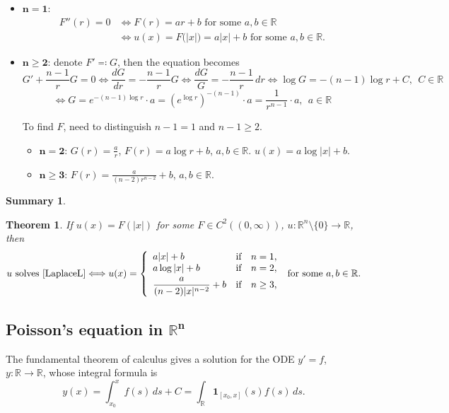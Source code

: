 \documentclass[12pt]{article}
\newtheorem{theorem}{Theorem}[section]
\theoremstyle{definition}
\newtheorem*{summary}{Summary}
\begin{document}
\begin{itemize}
\item $\boldsymbol{n=1}$:
\begin{align*}
F''(r)=0&\Longleftrightarrow F(r)=ar+b\text{ for some }a,b\in\mathbb R\\
&\Longleftrightarrow u(x)=F\big(|x|\big)=a|x|+b\text{ for some }a,b\in\mathbb R.
\end{align*}

\item $\boldsymbol{n\geq2}$: denote $F'\eqqcolon G$, then the equation becomes
\[G'+\frac{n-1}rG=0\Leftrightarrow\frac{dG}{dr}=-\frac{n-1}rG\Leftrightarrow\frac{dG}G=-\frac{n-1}r\,dr\Leftrightarrow\log G=-(n-1)\log r+C,\ \ C\in\mathbb R\]\[\Leftrightarrow G=e^{-(n-1)\log r}\cdot a=\left(e^{\log r}\right)^{-(n-1)}\cdot a=\frac1{r^{n-1}}\cdot a,\ \ a\in\mathbb R\]

To find $F$, need to distinguish $n-1=1$ and $n-1\geq2$.

\begin{itemize}
\item $\boldsymbol{n=2}$: $G(r)=\frac ar$, $F(r)=a\log r+b$, $a,b\in\mathbb R$. $u(x)=a\log|x|+b$.

\item $\boldsymbol{n\geq3}$: $F(r)=\frac a{(n-2)r^{n-2}}+b$, $a,b\in\mathbb R$.
\end{itemize}
\end{itemize}

\begin{summary}
\begin{theorem}
If $u(x)=F(|x|)$ for some $F\in C^2((0,\infty))$, $u:\mathbb R^n\setminus\{0\}\rightarrow\mathbb R$, then
\[u\text{ solves \eqref{LaplaceL}}\Longleftrightarrow u(x)=\left\{\begin{array}{lll}a|x|+b&\text{if}&n=1,\\a\log|x|+b&\text{if}&n=2,\vspace{1mm}\\\displaystyle{\frac a{(n-2)|x|^{n-2}}+b}&\text{if}&n\geq3,\end{array}\right.\text{ for some }a,b\in\mathbb R.\]
\end{theorem}
\end{summary}

\subsection[Poisson's equation in \texorpdfstring{$\mathbb R^n$}{R\^{}n}]{Poisson's equation in \texorpdfstring{$\boldsymbol{\mathbb R^n}$}{R\^{}n}}
The fundamental theorem of calculus gives a solution for the ODE $y'=f$, $y:\mathbb R\rightarrow\mathbb R$, whose integral formula is
\[y(x)=\int_{x_0}^xf(s)\,ds+C=\int_\mathbb R\boldsymbol1_{[x_0,x]}(s)f(s)\,ds.\]
\end{document}
